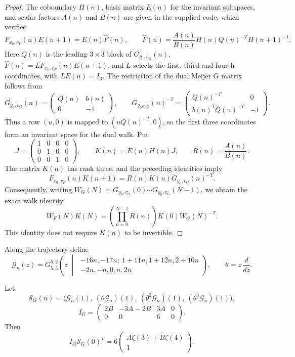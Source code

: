 \begin{proof}
The coboundary $H(n)$, basis matrix $E(n)$ for the invariant subspaces,
and scalar factors $A(n)$ and $B(n)$ are given in the supplied code,
which verifies
\[
F_{x_0,v_F}(n)E(n+1)=E(n)\widehat F(n),
\qquad
\widehat F(n)=\frac{A(n)}{B(n)}H(n)Q(n)^{-T}H(n+1)^{-1}.
\]
Here $Q(n)$ is the leading $3\times3$ block of $G_{y_0,v_G}(n)$,
$\widehat F(n)=LF_{x_0,v_F}(n)E(n+1)$, and $L$ selects the first, third
and fourth coordinates, with $LE(n)=I_3$.
The restriction of the dual Meijer G matrix follows from
\[
G_{y_0,v_G}(n)=\begin{pmatrix}Q(n)&b(n)\\0&-1\end{pmatrix},
\qquad
G_{y_0,v_G}(n)^{-T}
=\begin{pmatrix}Q(n)^{-T}&0\\b(n)^TQ(n)^{-T}&-1\end{pmatrix}.
\]
Thus a row $(u,0)$ is mapped to $(uQ(n)^{-T},0)$, so the first
three coordinates form an invariant space for the dual walk.
Put
\[
J=\begin{pmatrix}1&0&0&0\\0&1&0&0\\0&0&1&0\end{pmatrix},
\qquad K(n)=E(n)H(n)J,
\qquad R(n)=\frac{A(n)}{B(n)}.
\]
The matrix $K(n)$ has rank three, and the preceding identities imply
\[
F_{x_0,v_F}(n)K(n+1)=R(n)K(n)G_{y_0,v_G}(n)^{-T}.
\]
Consequently, writing $W_G(N)=G_{y_0,v_G}(0)\cdots
G_{y_0,v_G}(N-1)$, we obtain the exact walk identity
\[
W_F(N)K(N)
=\left(\prod_{n=0}^{N-1}R(n)\right)K(0)W_G(N)^{-T}.
\]
This identity does not require $K(n)$ to be invertible.
\end{proof}
Along the trajectory define
\[
\mathcal{G}_n(z)=G_{5,5}^{5,2}\!\left(
 z\;\middle|\;
 \begin{matrix}
 -16n,-17n;\ 1+11n,1+12n,2+10n\\
 -2n,-n,0,n,2n
 \end{matrix}\right),
\qquad \theta=z\,\frac{d}{dz}.
\]

\begin{proposition}
\label{prop:z34-initial-values}
Let
\[
\mathcal{S}_G(n)=\bigl(
\mathcal{G}_n(1),\ (\theta\mathcal{G}_n)(1),\
(\theta^2\mathcal{G}_n)(1),\ (\theta^3\mathcal{G}_n)(1)\bigr),
\]
\[
I_G=\begin{pmatrix}2B&-3A-2B&3A&0\\0&0&6&0\end{pmatrix}.
\]
Then
\[
I_G\mathcal{S}_G(0)^T
=6\begin{pmatrix}A\zeta(3)+B\zeta(4)\\1\end{pmatrix}.
\]
\end{proposition}

